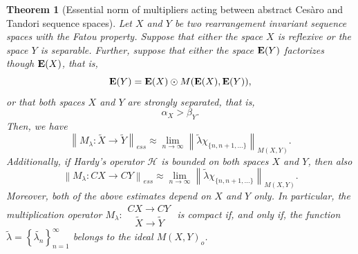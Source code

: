 \documentclass[11pt]{amsart}
\theoremstyle{definition}
\newtheorem{theorem}{Theorem}[section]
\theoremstyle{definition}
\theoremstyle{definition}
\theoremstyle{definition}
\theoremstyle{definition}
\theoremstyle{definition}
\theoremstyle{definition}
\theoremstyle{definition}
\numberwithin{equation}{section}
\numberwithin{equation}{section}
\numberwithin{equation}{section}
\theoremstyle{definition}
\theoremstyle{definition}
\theoremstyle{definition}
\theoremstyle{definition}
\theoremstyle{definition}
\theoremstyle{definition}
\newcommand{\norm}[1]{\left\lVert#1\right\rVert}
\begin{document}
\begin{theorem}[Essential norm of multipliers acting between abstract Ces{\` a}ro and Tandori sequence spaces] \label{THM: multipliers Cezaro i Tandori}
	{\it Let $X$ and $Y$ be two rearrangement invariant sequence spaces with the Fatou property.
		Suppose that either the space $X$ is reflexive or the space $Y$ is separable.
		Further, suppose that either the space ${\bf E}(Y)$ factorizes though ${\bf E}(X)$, that is,
		\begin{equation*}
			{\bf E}(Y) = {\bf E}(X) \odot M({\bf E}(X),{\bf E}(Y)),
		\end{equation*}
		or that both spaces $X$ and $Y$ are strongly separated, that is,
		\begin{equation*}
			\alpha_X > \beta_Y.
		\end{equation*}
		Then, we have
		\begin{equation*}
			\norm{M_{\lambda} \colon \widetilde{X} \rightarrow \widetilde{Y}}_{ess} \approx \lim\limits_{n \rightarrow \infty} \norm{\widetilde{\lambda}\chi_{\{n, n+1, ...\}}}_{M(X,Y)}.
		\end{equation*}
		Additionally, if Hardy's operator $\mathscr{H}$ is bounded on both spaces $X$ and $Y$, then also
		\begin{equation*}
			\norm{M_{\lambda} \colon CX \rightarrow CY}_{ess} \approx \lim\limits_{n \rightarrow \infty} \norm{\widetilde{\lambda}\chi_{\{n, n+1, ...\}}}_{M(X,Y)}.
		\end{equation*}
		Moreover, both of the above estimates depend on $X$ and $Y$ only.
		In particular, the multiplication operator $M_{\lambda} \colon \begin{array}{l} CX \rightarrow CY \\ \;\;\: \widetilde{X} \rightarrow \widetilde{Y} \end{array}$
		is compact if, and only if, the function $\widetilde{\lambda} = \left\{ \widetilde{\lambda_n} \right\}_{n=1}^{\infty}$ belongs to the ideal $M(X,Y)_o$.}
\end{theorem}
\end{document}
